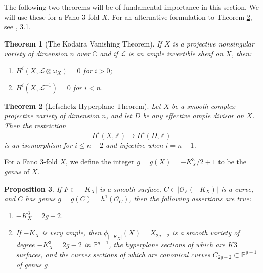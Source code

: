 \documentclass[11pt]{amsart}
\theoremstyle{plain}
\newtheorem{theorem}{Theorem}[section]
\newtheorem{proposition}[theorem]{Proposition}
\theoremstyle{definition}
\theoremstyle{expl}
\begin{document}
The following two theorems will be of fundamental importance in this section. We will use these for a Fano $3$-fold $X$. For an alternative formulation to Theorem \ref{C}, see \cite{Laz}, 3.1.
\begin{theorem}[The Kodaira Vanishing Theorem] If $X$ is a projective nonsingular variety of dimension $n$ over $\mathbb{C}$ and if $\mathcal{L}$ is an ample invertible sheaf on $X$, then: 
\begin{enumerate}
    \item[a)] $H^i(X, \mathcal{L}\otimes \omega_X) =0$ for $i>0$;
    \item[b)] $H^i(X,\mathcal{L}^{-1})=0$ for $i<n$.
\end{enumerate}
\end{theorem}
\begin{theorem}[Lefschetz Hyperplane Theorem]
\label{C}
    Let $X$ be a smooth complex projective variety of dimension $n$, and let $D$ be any effective ample divisor on $X$. Then the restriction 
    \[
    H^i(X,\mathbb{Z}) \rightarrow H^i(D,\mathbb{Z})
    \]
    is an isomorphism for $i\leq n-2$ and injective when $i=n-1$.
\end{theorem}

For a Fano $3$-fold $X$, we define the integer $g=g(X)= -K_X^3/2+1 $ to be the \textit{genus} of $X$.
\begin{proposition}
\label{A}
    If $F \in |-K_X|$ is a smooth surface, $C \in |\mathcal{O}_F(-K_X)|$ is a curve, and $C$ has genus $g=g(C) = h^1(\mathcal{O}_C)$, then the following assertions are true:
    \begin{enumerate}
        \item[(i)] $-K_{X}^3 = 2g-2 $.
        \item[(ii)] If $-K_X$ is very ample, then $\phi_{|-K_X|}(X)= X_{2g-2}$ is a smooth variety of degree $-K_{X}^3 = 2g-2$ in $\mathbb{P}^{g+1}$, the hyperplane sections of which are $K3$ surfaces, and the curves sections of which are canonical curves $C_{2g-2} \subset \mathbb{P}^{g-1}$ of genus $g$.
    \end{enumerate}
\end{proposition}
\end{document}
